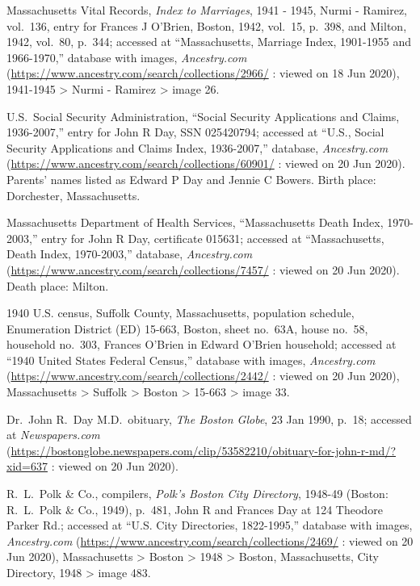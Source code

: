 \begin{thebibliography}{999}
	Massachusetts Vital Records, \textit{Index to Marriages}, 1941 - 1945, Nurmi - Ramirez, vol.\ 136, entry for Frances J O'Brien, Boston, 1942, vol.\ 15, p.\ 398, and Milton, 1942, vol.\ 80, p.\ 344;  accessed at ``Massachusetts, Marriage Index, 1901-1955 and 1966-1970,'' database with images, \textit{Ancestry.com} (\url{https://www.ancestry.com/search/collections/2966/} : viewed on 18 Jun 2020), 1941-1945 > Nurmi - Ramirez > image 26.
	
	U.S.\ Social Security Administration, ``Social Security Applications and Claims, 1936-2007,'' entry for John R Day, SSN 025420794; accessed at ``U.S., Social Security Applications and Claims Index, 1936-2007,'' database, \textit{Ancestry.com} (\url{https://www.ancestry.com/search/collections/60901/} : viewed on 20 Jun 2020).\\
	Parents' names listed as Edward P Day and Jennie C Bowers. Birth place: Dorchester, Massachusetts.
	
	Massachusetts Department of Health Services, ``Massachusetts Death Index, 1970-2003,'' entry for John R Day, certificate 015631; accessed at ``Massachusetts, Death Index, 1970-2003,'' database, \textit{Ancestry.com} (\url{https://www.ancestry.com/search/collections/7457/} : viewed on 20 Jun 2020).\\
	Death place: Milton.
	
	1940 U.S. census, Suffolk County, Massachusetts, population schedule, Enumeration District (ED) 15-663, Boston, sheet no.\ 63A, house no.\ 58, household no.\ 303, Frances O'Brien in Edward O'Brien household; accessed at ``1940 United States Federal Census,'' database with images, \textit{Ancestry.com} (\url{https://www.ancestry.com/search/collections/2442/} : viewed on 20 Jun 2020), Massachusetts > Suffolk > Boston > 15-663 > image 33.
	
	Dr.\ John R.\ Day M.D.\ obituary, \textit{The Boston Globe}, 23 Jan 1990, p.\ 18; accessed at \textit{Newspapers.com} (\url{https://bostonglobe.newspapers.com/clip/53582210/obituary-for-john-r-md/?xid=637} : viewed on 20 Jun 2020).
	
	R.\ L.\ Polk \& Co., compilers, \textit{Polk's Boston City Directory}, 1948-49 (Boston: R.\ L.\ Polk \& Co., 1949), p.\ 481, John R and Frances Day at 124 Theodore Parker Rd.; accessed at ``U.S. City Directories, 1822-1995,'' database with images, \textit{Ancestry.com} (\url{https://www.ancestry.com/search/collections/2469/} : viewed on 20 Jun 2020), Massachusetts > Boston > 1948 > Boston, Massachusetts, City Directory, 1948 > image 483.
	

\end{thebibliography}
